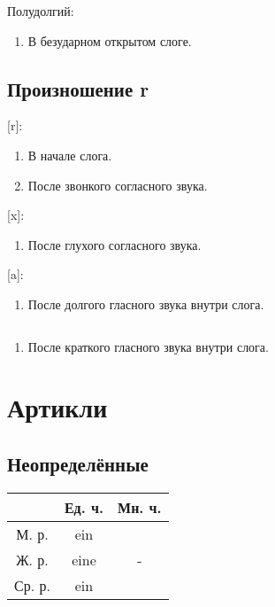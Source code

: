 \documentclass[oneside]{book}
\begin{document}
    Полудолгий:
    \begin{enumerate}
        \item В безударном открытом слоге.
    \end{enumerate}

    \section{Произношение r}
    [r]:
    \begin{enumerate}
        \item В начале слога.
        \item После звонкого согласного звука.
    \end{enumerate}

    [x]:
    \begin{enumerate}
        \item После глухого согласного звука.
    \end{enumerate}

    [a]:
    \begin{enumerate}
        \item После долгого гласного звука внутри слога.
    \end{enumerate}

    \begin{math}
        [\mu]
    \end{math}
    \begin{enumerate}
        \item После краткого гласного звука внутри слога.
    \end{enumerate}

    \chapter{Артикли}
    \section{Неопределённые}
    \begin{center}
        \begin{tabular}{|c|c|c|}
            \hline
                   & Ед. ч. & Мн. ч.                \\ \hline
            М. р.  & ein    & \multirow{3}{*}{-}    \\ \cline{1-2}
            Ж. р.  & eine   &                       \\ \cline{1-2}
            Ср. р. & ein    &                       \\ \hline
        \end{tabular}
    \end{center}
\end{document}
